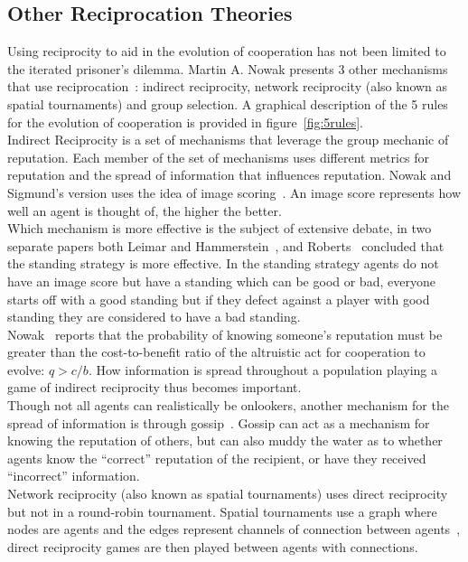 \documentclass[twoside,twocolumn]{article}
\begin{document}
\subsection{Other Reciprocation Theories}
Using reciprocity to aid in the evolution of cooperation has not been limited to the iterated prisoner's dilemma. Martin A. Nowak presents 3 other mechanisms that use reciprocation~\cite{five_rules_coop}: indirect reciprocity, network reciprocity (also known as spatial tournaments) and group selection. A graphical description of the 5 rules for the evolution of cooperation is provided in figure~\ref{fig:5rules}.\\
Indirect Reciprocity is a set of mechanisms that leverage the group mechanic of reputation. Each member of the set of mechanisms uses different metrics for reputation and the spread of information that influences reputation. Nowak and Sigmund's version uses the idea of image scoring~\cite{evol_indirect_image}. An image score represents how well an agent is thought of, the higher the better.\\
Which mechanism is more effective is the subject of extensive debate, in two separate papers both Leimar and Hammerstein~\cite{leimarhammer}, and Roberts~\cite{evoldirindir} concluded that the standing strategy is more effective. In the standing strategy agents do not have an image score but have a standing which can be good or bad, everyone starts off with a good standing but if they defect against a player with good standing they are considered to have a bad standing. \\
Nowak~\cite{five_rules_coop} reports that the probability of knowing someone's reputation must be greater than the cost-to-benefit ratio of the altruistic act for cooperation to evolve: $q>c/b$. How information is spread throughout a population playing a game of indirect reciprocity thus becomes important.\\
Though not all agents can realistically be onlookers, another mechanism for the spread of information is through gossip~\cite{gossip_alt}. Gossip can act as a mechanism for knowing the reputation of others, but can also muddy the water as to whether agents know the ``correct'' reputation of the recipient, or have they received ``incorrect'' information.\\
Network reciprocity (also known as spatial tournaments) uses direct reciprocity but not in a round-robin tournament. Spatial tournaments use a graph where nodes are agents and the edges represent channels of connection between agents~\cite{evol_graph}, direct reciprocity games are then played between agents with connections.\\
\end{document}
